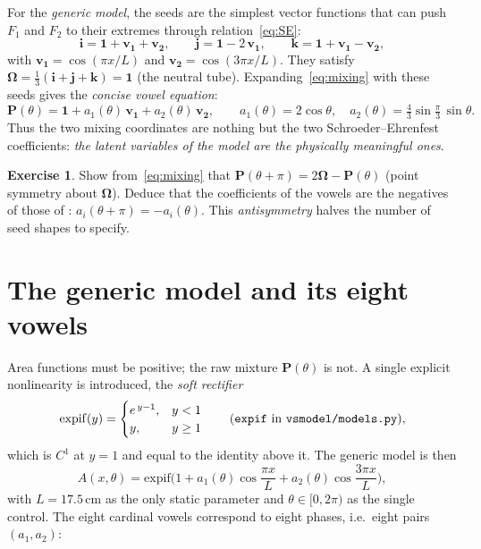 \documentclass[11pt]{article}
\newcommand{\code}[1]{\texttt{#1}}
\theoremstyle{definition}
\newtheorem{exercise}{Exercise}
\theoremstyle{remark}
\newcommand{\Fone}{F_1}
\newcommand{\Ftwo}{F_2}
\begin{document}
For the \emph{generic model}, the seeds are the simplest vector
functions that can push $\Fone$ and $\Ftwo$ to their extremes through
relation~\eqref{eq:SE}:
\begin{equation}
\bm{i}=\bm{1}+\bm{v_1}+\bm{v_2},\qquad
\bm{j}=\bm{1}-2\,\bm{v_1},\qquad
\bm{k}=\bm{1}+\bm{v_1}-\bm{v_2},
\label{eq:seeds}
\end{equation}
with $\bm{v_1}=\cos(\pi x/L)$ and $\bm{v_2}=\cos(3\pi x/L)$.
They satisfy $\bm{\Omega}=\frac13(\bm{i}+\bm{j}+\bm{k})=\bm{1}$ (the
neutral tube).  Expanding~\eqref{eq:mixing} with these seeds gives the
\emph{concise vowel equation}:
\begin{equation}
\bm{P}(\theta)=\bm{1}+a_1(\theta)\,\bm{v_1}+a_2(\theta)\,\bm{v_2},
\qquad
a_1(\theta)=2\cos\theta,\quad
a_2(\theta)=\tfrac{4}{3}\sin\tfrac{\pi}{3}\,\sin\theta .
\label{eq:Ptheta}
\end{equation}
Thus the two mixing coordinates are nothing but the two
Schroeder--Ehrenfest coefficients: \emph{the latent variables of the
model are the physically meaningful ones}.

\begin{exercise}
Show from~\eqref{eq:mixing} that
$\bm{P}(\theta+\pi)=2\bm{\Omega}-\bm{P}(\theta)$ (point symmetry about
$\bm{\Omega}$).  Deduce that the coefficients of the vowels
\textipa{[E, 1, O]} are the negatives of those of
\textipa{[u, a, i]}: $a_i(\theta+\pi)=-a_i(\theta)$.  This
\emph{antisymmetry} halves the number of seed shapes to specify.
\end{exercise}

\section{The generic model and its eight vowels}

Area functions must be positive; the raw mixture $\bm{P}(\theta)$ is
not.  A single explicit nonlinearity is introduced, the \emph{soft
rectifier}
\begin{equation}
\mathrm{expif}(y)=\begin{cases}e^{\,y-1}, & y<1\\ y, & y\ge 1\end{cases}
\qquad\text{(\code{expif} in \code{vsmodel/models.py}),}
\label{eq:expif}
\end{equation}
which is $C^1$ at $y=1$ and equal to the identity above it.  The generic
model is then
\begin{equation}
A(x,\theta)=\mathrm{expif}\Big(1+a_1(\theta)\cos\frac{\pi x}{L}
+a_2(\theta)\cos\frac{3\pi x}{L}\Big),
\label{eq:generic}
\end{equation}
with $L=17.5$\,cm as the only static parameter and
$\theta\in[0,2\pi)$ as the single control.  The eight cardinal vowels
correspond to eight phases, i.e.\ eight pairs $(a_1,a_2)$:
\end{document}
